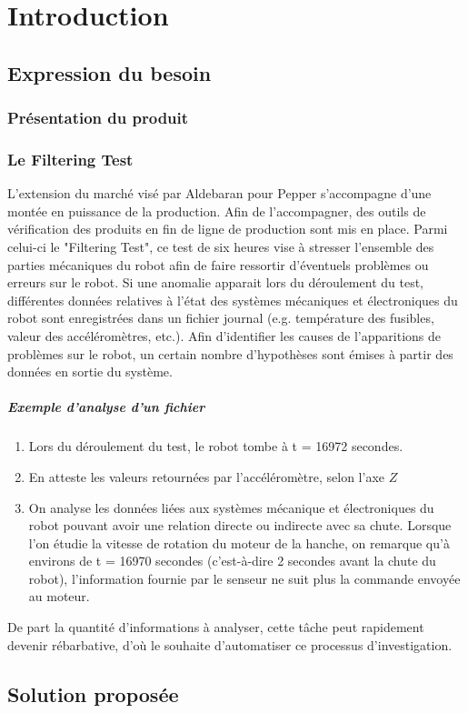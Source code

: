 \chapter{Introduction}
\label{Introduction}
\thispagestyle{fancy}

\section{Expression du besoin}
\label{Introduction:Contexte}

\subsection{Présentation du produit}
\label{Introduction:Contexte:Filtering Le Hardware de Pepper}


\subsection{Le Filtering Test}
\label{Introduction:Contexte:Filtering Test}
L'extension du marché visé par Aldebaran pour Pepper s'accompagne d'une montée en puissance de la production. Afin de l'accompagner, des outils de vérification des produits en fin de ligne de production sont mis en place. Parmi celui-ci le "Filtering Test", ce test de six heures vise à stresser l'ensemble des parties mécaniques du robot afin de faire ressortir d'éventuels problèmes ou erreurs sur le robot. Si une anomalie apparait lors du déroulement du test, différentes données relatives à l'état des systèmes mécaniques et électroniques du robot sont enregistrées dans un fichier journal (e.g. température des fusibles, valeur des accéléromètres, etc.). Afin d'identifier les causes de l'apparitions de problèmes sur le robot, un certain nombre d'hypothèses sont émises à partir des données en sortie du système. 

\paragraph{Exemple d'analyse d'un fichier}
\begin{enumerate}
	\item Lors du déroulement du test, le robot tombe à t = 16972 secondes.
	\item En atteste les valeurs retournées par l'accéléromètre, selon l'axe $Z$
	\item On analyse les données liées aux systèmes mécanique et électroniques du robot pouvant avoir une relation directe ou indirecte avec sa chute.  
	Lorsque l'on étudie la vitesse de rotation du moteur de la hanche, on remarque qu'à environs de  t = 16970 secondes (c'est-à-dire 2 secondes avant la chute du robot),  l'information fournie par le senseur ne suit plus la commande  envoyée au moteur.
\end{enumerate}

De part la quantité d'informations à analyser, cette tâche peut rapidement devenir rébarbative, d'où le souhaite d'automatiser ce processus d'investigation.

\section{Solution proposée}